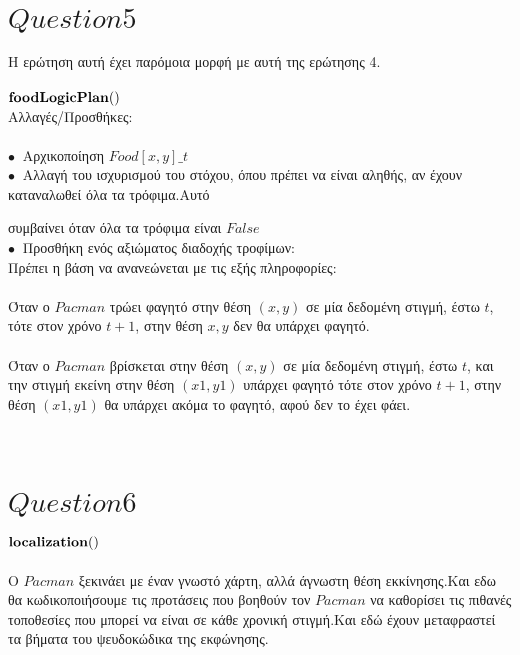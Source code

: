 \documentclass[10pt]{article}
\begin{document}
\section*{$Question 5$}
\vspace{5mm}
Η ερώτηση αυτή έχει παρόμοια μορφή με αυτή της ερώτησης 4. \\ \\
\underline{\underline{$\bf  foodLogicPlan()$}} \\ 

Αλλαγές/Προσθήκες: \\ \\

$\bullet \ $ Αρχικοποίηση $Food[x,y]\_t$ \\

$\bullet \ $ Αλλαγή του ισχυρισμού του στόχου, όπου πρέπει να είναι αληθής, αν έχουν καταναλωθεί όλα τα τρόφιμα.Αυτό 

συμβαίνει όταν όλα τα τρόφιμα είναι $False$ \\

$\bullet \ $ Προσθήκη ενός αξιώματος διαδοχής  τροφίμων: \\

Πρέπει η βάση να ανανεώνεται με τις εξής πληροφορίες: \\ \\
Όταν ο $Pacman$ τρώει φαγητό στην θέση $(x,y)$ σε μία δεδομένη στιγμή, έστω $t$, τότε στον χρόνο $t+1$, στην θέση $x,y$ δεν θα υπάρχει φαγητό.  \\ \\
Όταν ο $Pacman$ βρίσκεται στην θέση $(x,y)$ σε μία δεδομένη στιγμή, έστω $t$, και την στιγμή εκείνη στην θέση $(x1,y1)$ υπάρχει φαγητό τότε στον χρόνο $t+1$, στην θέση $(x1,y1)$ θα υπάρχει ακόμα το φαγητό, αφού δεν το έχει φάει.
\\ \\ \\
\section*{$Question 6$}
\vspace{5mm}
\underline{\underline{$\bf  localization()$}} \\ \\
Ο $Pacman$ ξεκινάει με έναν γνωστό χάρτη, αλλά άγνωστη θέση εκκίνησης.Και εδω θα κωδικοποιήσουμε τις προτάσεις που βοηθούν τον $Pacman$ να καθορίσει τις πιθανές τοποθεσίες που μπορεί να είναι σε κάθε χρονική στιγμή.Και εδώ έχουν μεταφραστεί τα βήματα του ψευδοκώδικα της εκφώνησης.
\\ \\ \\
\end{document}
